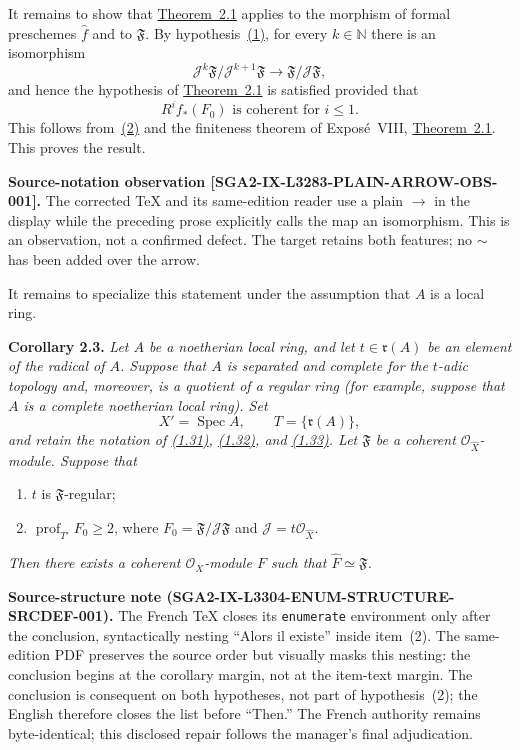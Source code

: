 \documentclass[11pt,a4paper,oneside]{book}
\providecommand{\prof}{\operatorname{prof}}
\theoremstyle{plain}
\theoremstyle{definition}
\theoremstyle{remark}
\begin{document}
\medskip
It remains to show that \hyperref[IX.2.1]{Theorem~2.1} applies to the morphism of formal
preschemes $\widehat f$ and to $\mathfrak F$. By hypothesis~\hyperref[IX.2.2]{(1)}, for every
$k\in\mathbb N$ there is an isomorphism
\[
\mathcal J^k\mathfrak F/\mathcal J^{k+1}\mathfrak F
  \to \mathfrak F/\mathcal J\mathfrak F,
\]
and hence the hypothesis of \hyperref[IX.2.1]{Theorem~2.1} is satisfied provided that
\[
R^i f_*(F_0)\text{ is coherent for }i\leq 1.
\]
This follows from~\hyperref[IX.2.2]{(2)} and the finiteness theorem of Expos\'e~VIII,
\hyperref[IX.2.1]{Theorem~2.1}. This proves the result.

\medskip
\noindent\colorbox{softgray}{\parbox{0.95\linewidth}{\footnotesize
\color{notegray}\textbf{Source-notation observation
[SGA2-IX-L3283-PLAIN-ARROW-OBS-001].}
The corrected TeX and its same-edition reader use a plain $\to$ in the
display while the preceding prose explicitly calls the map an isomorphism.
This is an observation, not a confirmed defect. The target retains both
features; no $\sim$ has been added over the arrow.}}

\medskip
It remains to specialize this statement under the assumption that $A$ is a
local ring.

\medskip
{}\noindent\textbf{Corollary 2.3.}\quad
\emph{Let $A$ be a noetherian local ring, and let
$t\in\mathfrak r(A)$ be an element of the radical of $A$. Suppose that $A$
is separated and complete for the $t$-adic topology and, moreover, is a
quotient of a regular ring (for example, suppose that $A$ is a complete
noetherian local ring). Set}
\begin{equation}
\tag{2.9}\label{eq:IX.2.9}
X'=\operatorname{Spec}A,\qquad T=\{\mathfrak r(A)\},
\end{equation}
\emph{and retain the notation of \hyperref[eq:IX.1.31]{(1.31)}, \hyperref[eq:IX.1.32]{(1.32)}, and \hyperref[eq:IX.1.33]{(1.33)}. Let
$\mathfrak F$ be a coherent $\mathcal O_{\widehat X}$-module. Suppose that}
\begin{enumerate}
\item $t$ is $\mathfrak F$-regular;
\item $\prof_{T'}F_0\geq 2$, where
$F_0=\mathfrak F/\mathcal J\mathfrak F$ and
$\mathcal J=t\mathcal O_{\widehat X}$.
\end{enumerate}
\emph{Then there exists a coherent $\mathcal O_X$-module $F$ such that
$\widehat F\simeq\mathfrak F$.}

\medskip
\noindent\colorbox{softgray}{\parbox{0.95\linewidth}{\footnotesize
\color{notegray}\textbf{Source-structure note
(SGA2-IX-L3304-ENUM-STRUCTURE-SRCDEF-001).}
The French TeX closes its \texttt{enumerate} environment only after the
conclusion, syntactically nesting ``Alors il existe'' inside item~(2). The
same-edition PDF preserves the source order but visually masks this nesting:
the conclusion begins at the corollary margin, not at the item-text margin.
The conclusion is consequent on both hypotheses, not part of hypothesis~(2);
the English therefore closes the list before ``Then.'' The French authority
remains byte-identical; this disclosed repair follows the manager's final
adjudication.}}
\end{document}
